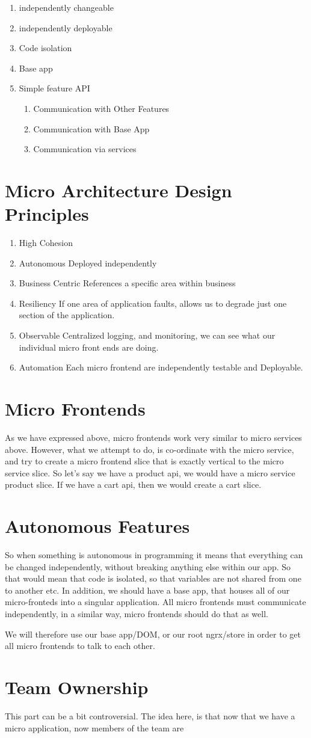 \begin{enumerate}
  \item independently changeable
  \item independently deployable
  \item Code isolation
  \item Base app
  \item Simple feature API
  \begin{enumerate}
    \item Communication with Other Features
    \item Communication with Base App
    \item Communication via services
  \end{enumerate}
\end{enumerate}

\section{Micro Architecture Design Principles}
\begin{enumerate}
  \item High Cohesion 
  \item Autonomous 
Deployed independently 
  \item Business Centric
References a specific area within business 
  \item Resiliency 
If one area of application faults, allows us to degrade just one section of the application. 
  \item Observable 
Centralized logging, and monitoring, we can see what our individual micro front ends are doing.
  \item Automation 
Each micro frontend are independently testable and Deployable. 
\end{enumerate}

\section{Micro Frontends}
As we have expressed above, micro frontends work very similar to micro services above. However, what we attempt to do, is co-ordinate with the micro service, and try to create a micro frontend slice that is exactly vertical to the micro service slice. So let's say we have a product api, we would have a micro service product slice. If we have a cart api, then we would create a cart slice. 

\section{Autonomous Features}
So when something is autonomous in programming it means that everything can be changed independently, without breaking anything else within our app. So that would mean that code is isolated, so that variables are not shared from one to another etc. In addition, we should have a base app, that houses all of our micro-fronteds into a singular application. All micro frontends must communicate independently, in a similar way, micro frontends should do that as well. 

We will therefore use our base app/DOM, or our root ngrx/store in order to get all micro frontends to talk to each other. 

\section{Team Ownership}
This part can be a bit controversial. The idea here, is that now that we have a micro application, now members of the team are 